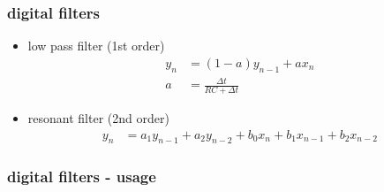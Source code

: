 \documentclass{beamer}
\begin{document}
\begin{frame}
  
  \frametitle{\bf digital filters}

  \begin{itemize}

    \item low pass filter (1st order)
      \begin{align*}
        y_{n}&= (1 - a)y_{n-1} + a x_{n} \\
        a &= \frac{\Delta t}{RC + \Delta t}
      \end{align*}
  

    \item resonant filter (2nd order)
      \begin{align*}
        y_{n}&= a_{1}y_{n-1} + a_{2}y_{n-2} + b_{0}x_{n} + b_{1}x_{n-1} + b_{2}x_{n-2} 
      \end{align*}

  \end{itemize}

  
\end{frame}


\begin{frame}
  
  \frametitle{\bf digital filters - usage}


\end{frame}
\end{document}
